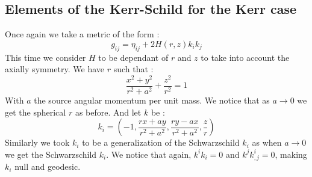 \documentclass[a4paper,12pt]{article}
\theoremstyle{definition}
\begin{document}
\subsection{Elements of the Kerr-Schild for the Kerr case}
Once again we take a metric of the form :
\begin{equation}
	g_{ij}=\eta_{ij}+2H(r,z)k_ik_j
\end{equation}
This time we consider $H$ to be dependant of $r$ and $z$ to take into account the axially symmetry.
We have $r$ such that :
\begin{equation}
	\frac{x^2+y^2}{r^2+a^2}+\frac{z^2}{r^2}=1
\end{equation}
With $a$ the source angular momentum per unit mass.
We notice that as $a \rightarrow 0$ we get the spherical $r$ as before.
And let $k$ be :
\begin{equation}
	k_i=(-1,\frac{r x + a y}{r^2 + a^2},\frac{ry-ax}{r^2+a^2},\frac{z}{r})
\end{equation}
Similarly we took $k_i$ to be a generalization of the Schwarzschild $k_i$ as when $a \rightarrow 0$ we get the Schwarzschild $k_i$.
We notice that again, $k^ik_i=0$ and $k^jk^i_{,j}=0$, making $k_i$ null and geodesic.
\end{document}
